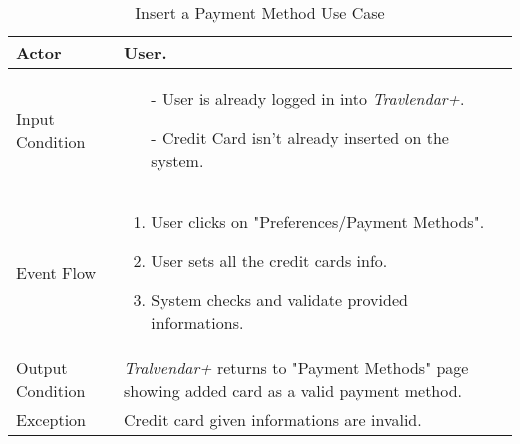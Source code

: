 		\begin{table}[H]
			\begin{tabular}{| l | p{} | }
				\hline
				\hline
				Actor	&		User. \\
				\hline
				Input Condition		&		\begin{itemize}
														\item[-] User is already logged in into \textit{Travlendar+}.
														\item[-] Credit Card isn't already inserted on the system.
													\end{itemize} \\
				\hline
				Event Flow		&		\begin{enumerate}
													\item User clicks on "Preferences/Payment Methods".
													\item User sets all the credit cards info.
													\item System checks and validate provided informations.
												\end{enumerate} \\
				\hline
				Output Condition		&		\textit{Tralvendar+} returns to "Payment Methods" page showing added card as a valid payment method.\\	
				\hline		
				Exception		&		Credit card given informations are invalid. \\
				\hline
				\hline
			\end{tabular}
			\caption{Insert a Payment Method Use Case}
		\end{table}



